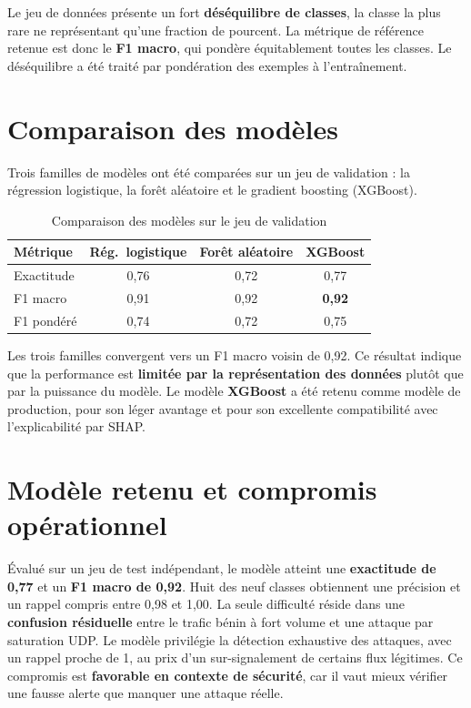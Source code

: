 \documentclass[12pt,a4paper,oneside]{report}
\begin{document}
Le jeu de données présente un fort \textbf{déséquilibre de classes}, la classe la plus rare ne représentant qu'une fraction de pourcent. La métrique de référence retenue est donc le \textbf{F1 macro}, qui pondère équitablement toutes les classes. Le déséquilibre a été traité par pondération des exemples à l'entraînement.

\section{Comparaison des modèles}
Trois familles de modèles ont été comparées sur un jeu de validation : la régression logistique, la forêt aléatoire et le gradient boosting (XGBoost).

\begin{table}[h]
\centering
\caption{Comparaison des modèles sur le jeu de validation}
\begin{tabularx}{\textwidth}{Xccc}
\toprule
\textbf{Métrique} & \textbf{Rég.\ logistique} & \textbf{Forêt aléatoire} & \textbf{XGBoost} \\
\midrule
Exactitude & 0,76 & 0,72 & 0,77 \\
F1 macro   & 0,91 & 0,92 & \textbf{0,92} \\
F1 pondéré & 0,74 & 0,72 & 0,75 \\
\bottomrule
\end{tabularx}
\end{table}

Les trois familles convergent vers un F1 macro voisin de 0,92. Ce résultat indique que la performance est \textbf{limitée par la représentation des données} plutôt que par la puissance du modèle. Le modèle \textbf{XGBoost} a été retenu comme modèle de production, pour son léger avantage et pour son excellente compatibilité avec l'explicabilité par SHAP.

\section{Modèle retenu et compromis opérationnel}
Évalué sur un jeu de test indépendant, le modèle atteint une \textbf{exactitude de 0,77} et un \textbf{F1 macro de 0,92}. Huit des neuf classes obtiennent une précision et un rappel compris entre 0,98 et 1,00. La seule difficulté réside dans une \textbf{confusion résiduelle} entre le trafic bénin à fort volume et une attaque par saturation UDP. Le modèle privilégie la détection exhaustive des attaques, avec un rappel proche de 1, au prix d'un sur-signalement de certains flux légitimes. Ce compromis est \textbf{favorable en contexte de sécurité}, car il vaut mieux vérifier une fausse alerte que manquer une attaque réelle.
\end{document}
